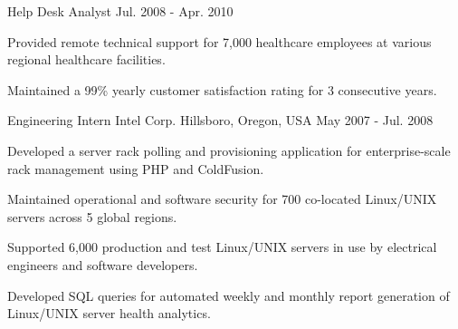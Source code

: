 \begin{cventries}
  \cventry
    {Help Desk Analyst} %
    {} %
    {} %
    {Jul. 2008 - Apr. 2010} %
    {
      \begin{cvitems} %
        \item {Provided remote technical support for 7,000 healthcare employees at various regional healthcare facilities.}
        \item {Maintained a 99\% yearly customer satisfaction rating for 3 consecutive years.}
      \end{cvitems}
    }

  \cventry
    {Engineering Intern} %
    {Intel Corp.} %
    {Hillsboro, Oregon, USA} %
    {May 2007 - Jul. 2008} %
    {
      \begin{cvitems} %
        \item {Developed a server rack polling and provisioning application for enterprise-scale rack management using PHP and ColdFusion.}
        \item {Maintained operational and software security for 700 co-located Linux/UNIX servers across 5 global regions.}
        \item {Supported 6,000 production and test Linux/UNIX servers in use by electrical engineers and software developers.}
        \item {Developed SQL queries for automated weekly and monthly report generation of Linux/UNIX server health analytics.}
      \end{cvitems}
    }

\end{cventries}
